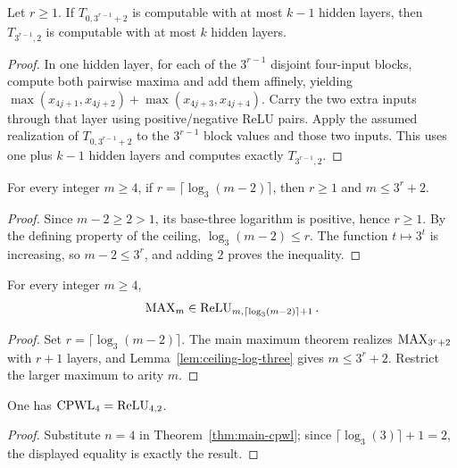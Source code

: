 \begin{lemma}
  \label{lem:claim-seven}
  Let $r\geq1$.  If $T_{0,3^{r-1}+2}$ is computable with at most $k-1$
  hidden layers, then $T_{3^{r-1},2}$ is computable with at most $k$ hidden
  layers.
\end{lemma}
\begin{proof}
  In one hidden layer, for each of the $3^{r-1}$ disjoint four-input blocks,
  compute both pairwise maxima and add them affinely, yielding
  $\max(x_{4j+1},x_{4j+2})+\max(x_{4j+3},x_{4j+4})$.
  Carry the two extra inputs through that layer using positive/negative ReLU
  pairs.  Apply the assumed realization of $T_{0,3^{r-1}+2}$ to the
  $3^{r-1}$ block values and those two inputs.  This uses one plus $k-1$
  hidden layers and computes exactly $T_{3^{r-1},2}$.
\end{proof}

\begin{lemma}
  \label{lem:ceiling-log-three}
  For every integer $m\geq4$, if
  $r=\lceil\log_3(m-2)\rceil$, then $r\geq1$ and $m\leq3^r+2$.
\end{lemma}
\begin{proof}
  Since $m-2\geq2>1$, its base-three logarithm is positive, hence $r\geq1$.
  By the defining property of the ceiling,
  $\log_3(m-2)\leq r$.  The function $t\mapsto3^t$ is increasing, so
  $m-2\leq3^r$, and adding $2$ proves the inequality.
\end{proof}

\begin{corollary}
  \label{cor:max-general-depth}
  For every integer $m\geq4$,
  \[
    \operatorname{MAX}_m\in\operatorname{ReLU}_{m,\lceil\log_3(m-2)\rceil+1}.
  \]
\end{corollary}
\begin{proof}
  Set $r=\lceil\log_3(m-2)\rceil$.  The main maximum theorem realizes
  $\operatorname{MAX}_{3^r+2}$ with $r+1$ layers, and
  Lemma~\ref{lem:ceiling-log-three} gives $m\leq3^r+2$.  Restrict the larger
  maximum to arity $m$.
\end{proof}

\begin{corollary}
  \label{cor:cpwl-four-two-layers}
  One has $\operatorname{CPWL}_4=\operatorname{ReLU}_{4,2}$.
\end{corollary}
\begin{proof}
  Substitute $n=4$ in Theorem~\ref{thm:main-cpwl}; since
  $\lceil\log_3(3)\rceil+1=2$, the displayed equality is exactly the result.
\end{proof}

